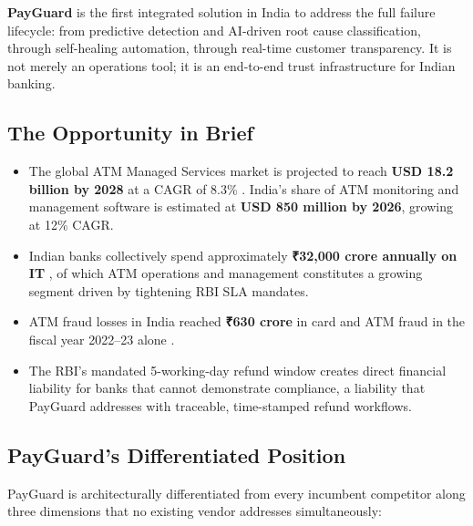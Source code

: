 \documentclass[12pt,a4paper]{article}
\newcommand{\inr}{₹}
\begin{document}
\textbf{PayGuard} is the first integrated solution in India to address the full failure lifecycle: from predictive detection and AI-driven
root cause classification, through self-healing automation, through real-time customer
transparency. It is not merely an operations tool; it is an end-to-end trust infrastructure for
Indian banking.

\subsection*{The Opportunity in Brief}

\begin{itemize}
  \item The global ATM Managed Services market is projected to reach \textbf{USD 18.2 billion by
        2028} at a CAGR of 8.3\% \citep{mm2023atm}. India's share of ATM monitoring and
        management software is estimated at \textbf{USD 850 million by 2026}, growing at 12\% CAGR.
  \item Indian banks collectively spend approximately \textbf{\inr{}32,000 crore annually on IT}
        \citep{nasscom2024,rbi2024annual}, of which ATM operations and management constitutes a
        growing segment driven by tightening RBI SLA mandates.
  \item ATM fraud losses in India reached \textbf{\inr{}630 crore} in card and ATM fraud in the
        fiscal year 2022--23 alone \citep{rbi2023fraud}.
  \item The RBI's mandated 5-working-day refund window \citep{rbi2011circular} creates direct
        financial liability for banks that cannot demonstrate compliance, a liability that PayGuard
        addresses with traceable, time-stamped refund workflows.
\end{itemize}

\subsection*{PayGuard's Differentiated Position}

PayGuard is architecturally differentiated from every incumbent competitor along three
dimensions that no existing vendor addresses simultaneously:
\end{document}
